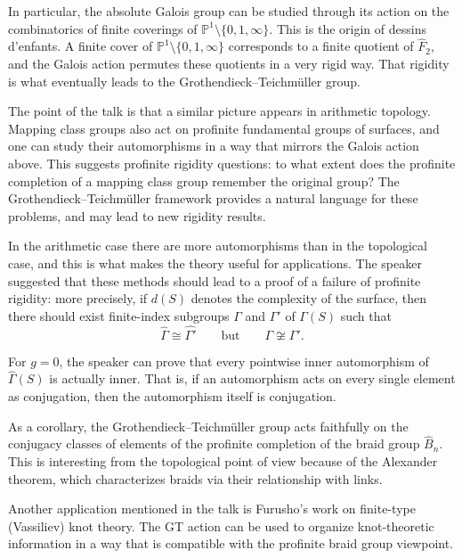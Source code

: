 \medskip\noindent
In particular, the absolute Galois group can
be studied through its action on the
combinatorics of finite coverings of
\(\mathbb{P}^1\setminus\{0,1,\infty\}\).
This is the origin of dessins d'enfants.
A finite cover of
\(\mathbb{P}^1\setminus\{0,1,\infty\}\)
corresponds to a finite quotient of
\(\widehat{F}_2\), and the Galois action
permutes these quotients in a very rigid way.
That rigidity is what eventually leads to the
Grothendieck--Teichm\"uller group.

\medskip\noindent
The point of the talk is that a similar
picture appears in arithmetic topology.
Mapping class groups also act on profinite
fundamental groups of surfaces, and one can
study their automorphisms in a way that
mirrors the Galois action above. This
suggests profinite rigidity questions: to
what extent does the profinite completion of
a mapping class group remember the original
group? The Grothendieck--Teichm\"uller
framework provides a natural language for
these problems, and may lead to new rigidity
results.

\medskip\noindent
In the arithmetic case there are more
automorphisms than in the topological case,
and this is what makes the theory useful for
applications. The speaker suggested that
these methods should lead to a proof of a
failure of profinite rigidity: more
precisely, if \(d(S)\) denotes the complexity
of the surface, then there should exist
finite-index subgroups \(\Gamma\) and
\(\Gamma'\) of \(\Gamma(S)\) such that
$$
\widehat{\Gamma}\cong \widehat{\Gamma'}
\qquad\text{but}\qquad
\Gamma\not\cong \Gamma'.
$$

\medskip\noindent
For \(g=0\), the speaker can prove that every
pointwise inner automorphism of
\(\widehat{\Gamma}(S)\) is actually inner.
That is, if an automorphism acts on every
single element as conjugation, then the
automorphism itself is conjugation.

\medskip\noindent
As a corollary, the Grothendieck--Teichm\"uller
group acts faithfully on the conjugacy
classes of elements of the profinite
completion of the braid group
\(\widehat{B}_n\). This is interesting from
the topological point of view because of the
Alexander theorem, which characterizes
braids via their relationship with links.

\medskip\noindent
Another application mentioned in the talk is
Furusho's work on finite-type (Vassiliev)
knot theory. The GT action can be used to
organize knot-theoretic information in a way
that is compatible with the profinite braid
group viewpoint.

